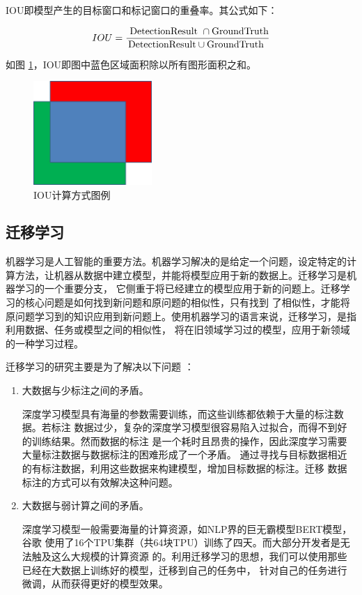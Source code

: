 IOU即模型产生的目标窗口和标记窗口的重叠率。其公式如下：

\begin{equation}
    \centering
    I O U = \frac { \text { DetectionResult } \cap \text {GroundTruth} } { \text {DetectionResult} \cup \text {GroundTruth } }
    \label{IOU_equation}
\end{equation}

如图 \ref{fig:IOU_equation}，IOU即图中蓝色区域面积除以所有图形面积之和。

\begin{figure}[htbp]
    \centering
    \includegraphics[width=0.4\textwidth]{pic/chap3/IOU.jpg}
    \caption{IOU计算方式图例}
    \label{fig:IOU_equation}
\end{figure}

\subsection{迁移学习}
机器学习是人工智能的重要方法。机器学习解决的是给定一个问题，设定特定的计算方法，让机器从数据中建立模型，并能将模型应用于新的数据上。迁移学习是机器学习的一个重要分支，
它侧重于将已经建立的模型应用于新的问题上。迁移学习的核心问题是如何找到新问题和原问题的相似性，只有找到
了相似性，才能将原问题学习到的知识应用到新问题上。使用机器学习的语言来说，迁移学习，是指利用数据、任务或模型之间的相似性，
将在旧领域学习过的模型，应用于新领域的一种学习过程。

迁移学习的研究主要是为了解决以下问题 \cite{TL_tutorial}：
 
\begin{enumerate}
    \item {大数据与少标注之间的矛盾。
    
    深度学习模型具有海量的参数需要训练，而这些训练都依赖于大量的标注数据。若标注
    数据过少，复杂的深度学习模型很容易陷入过拟合，而得不到好的训练结果。然而数据的标注
    是一个耗时且昂贵的操作，因此深度学习需要大量标注数据与数据标注的困难形成了一个矛盾。
    通过寻找与目标数据相近的有标注数据，利用这些数据来构建模型，增加目标数据的标注。迁移
    数据标注的方式可以有效解决这种问题。}
    \item {大数据与弱计算之间的矛盾。
    
    深度学习模型一般需要海量的计算资源，如NLP界的巨无霸模型BERT\cite{BERT}模型，谷歌
    使用了16个TPU集群（共64块TPU）训练了四天。而大部分开发者是无法触及这么大规模的计算资源
    的。利用迁移学习的思想，我们可以使用那些已经在大数据上训练好的模型，迁移到自己的任务中，
    针对自己的任务进行微调，从而获得更好的模型效果。}
\end{enumerate}

